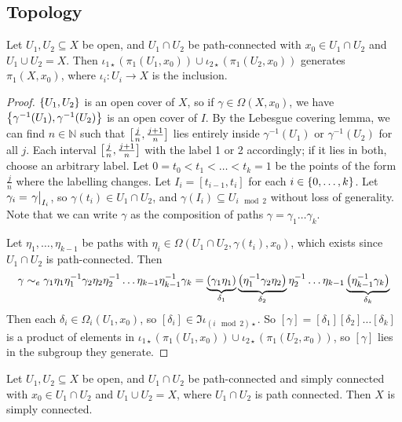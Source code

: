 \subsection{Topology}
\begin{theorem}
	Let \( U_1, U_2 \subseteq X \) be open, and \( U_1 \cap U_2 \) be path-connected with \( x_0 \in U_1 \cap U_2 \) and \( U_1 \cup U_2 = X \).
	Then \( \iota_{1\star}(\pi_1(U_1,x_0)) \cup \iota_{2\star}(\pi_1(U_2,x_0)) \) generates \( \pi_1(X,x_0) \), where \( \iota_i \colon U_i \to X \) is the inclusion.
\end{theorem}
\begin{proof}
	\( \qty{U_1, U_2} \) is an open cover of \( X \), so if \( \gamma \in \Omega(X,x_0) \), we have \( \qty{\gamma^{-1}(U_1), \gamma^{-1}(U_2)} \) is an open cover of \( I \).
	By the Lebesgue covering lemma, we can find \( n \in \mathbb N \) such that \( \qty[\frac{j}{n}, \frac{j+1}{n}] \) lies entirely inside \( \gamma^{-1}(U_1) \) or \( \gamma^{-1}(U_2) \) for all \( j \).
	Each interval \( \qty[\frac{j}{n}, \frac{j+1}{n}] \) with the label 1 or 2 accordingly; if it lies in both, choose an arbitrary label.
	Let \( 0 = t_0 < t_1 < \dots < t_k = 1 \) be the points of the form \( \frac{j}{n} \) where the labelling changes.
	Let \( I_i = [t_{i-1}, t_i] \) for each \( i \in \qty{0, \dots, k} \).
	Let \( \gamma_i = \eval{\gamma}_{I_i} \), so \( \gamma(t_i) \in U_1 \cap U_2 \), and \( \gamma(I_i) \subseteq U_{i \mod 2} \) without loss of generality.
	Note that we can write \( \gamma \) as the composition of paths \( \gamma = \gamma_1 \dots \gamma_k \).

	Let \( \eta_1, \dots, \eta_{k-1} \) be paths with \( \eta_i \in \Omega(U_1 \cap U_2, \gamma(t_i), x_0) \), which exists since \( U_1 \cap U_2 \) is path-connected.
	Then
	\[ \gamma \sim_e \gamma_1 \eta_1 \eta_1^{-1} \gamma_2 \eta_2 \eta_2^{-1} \dots \eta_{k-1} \eta_{k-1}^{-1} \gamma_k = \underbrace{\qty(\gamma_1 \eta_1)}_{\delta_1} \underbrace{\qty(\eta_1^{-1} \gamma_2 \eta_2)}_{\delta_2} \eta_2^{-1} \dots \eta_{k-1} \underbrace{\qty(\eta_{k-1}^{-1} \gamma_k)}_{\delta_k} \]
	Then each \( \delta_i \in \Omega_i(U_1, x_0) \), so \( [\delta_i] \in \Im \iota_{(i \mod 2)\star} \).
	So \( [\gamma] = [\delta_1][\delta_2]\dots[\delta_k] \) is a product of elements in \( \iota_{1\star}(\pi_1(U_1,x_0)) \cup \iota_{2\star}(\pi_1(U_2,x_0)) \), so \( [\gamma] \) lies in the subgroup they generate.
\end{proof}
\begin{corollary}
	Let \( U_1, U_2 \subseteq X \) be open, and \( U_1 \cap U_2 \) be path-connected and simply connected with \( x_0 \in U_1 \cap U_2 \) and \( U_1 \cup U_2 = X \), where \( U_1 \cap U_2 \) is path connected.
	Then \( X \) is simply connected.
\end{corollary}
